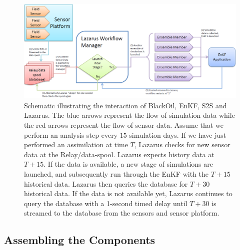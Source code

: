 \documentclass{acm_proc_article-sp}
\newcommand{\jhanote}[1]{ {\textcolor{red} { ***Jha: #1 }}}
\newcommand{\jhanote}[1]{}
\begin{document}
\begin{figure}
\begin{center}
 \includegraphics*[scale=0.3,angle=0]{figures/EnKF.png}
\end{center}
\caption{Schematic illustrating the interaction of BlackOil, EnKF, S2S
  and Lazarus. The blue arrows represent the flow of simulation data
  while the red arrows represent the flow of sensor data. Assume that
  we perform an analysis step every $15$ simulation days. If we have
  just performed an assimilation at time $T$, Lazarus checks for new
  sensor data at the Relay/data-spool. Lazarus expects history data at
  $T+15$. If the data is available, a new stage of simulations are
  launched, and subsequently run through the EnKF with the $T+15$
  historical data. Lazarus then queries the database for $T+30$
  historical data. If the data is not available yet, Lazarus continues
  to query the database with a 1-second timed delay until $T+30$ is
  streamed to the database from the sensors and sensor
  platform. 
}
\label{fig:SensorRelay}
\end{figure}

\subsection{Assembling the Components } 

\end{document}
